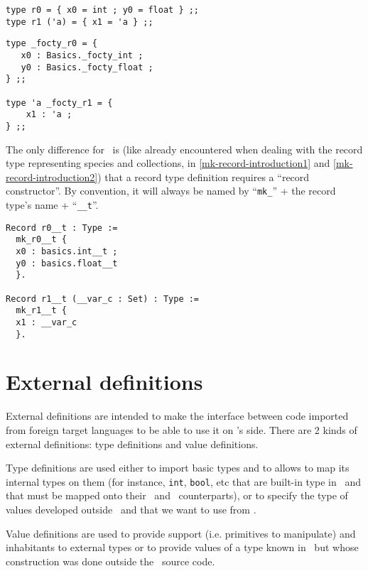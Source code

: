 {\footnotesize
\begin{lstlisting}[title=Record type definitions in \focalize]
type r0 = { x0 = int ; y0 = float } ;;
type r1 ('a) = { x1 = 'a } ;;
\end{lstlisting}}

{\footnotesize
\begin{lstlisting}[language=MyOCaml,
                   title=Generated record type definitions in \ocaml]
type _focty_r0 = { 
   x0 : Basics._focty_int ;
   y0 : Basics._focty_float ;
} ;;

type 'a _focty_r1 = { 
    x1 : 'a ;
} ;;
\end{lstlisting}}

The only difference for \coq\ is (like already encountered when
dealing with the record type representing species and collections,
in \ref{mk-record-introduction1} and \ref{mk-record-introduction2}) 
that a record type definition requires a ``record constructor''. By
convention, it will always be named by ``{\tt mk\_}'' + the record
type's name + ``{\tt \_\_t}''. 

{\footnotesize
\begin{lstlisting}[language=MyCoq,
                   title=Generated record type definitions in \coq]
Record r0__t : Type :=
  mk_r0__t {
  x0 : basics.int__t ;
  y0 : basics.float__t
  }.

Record r1__t (__var_c : Set) : Type :=
  mk_r1__t {
  x1 : __var_c
  }.
\end{lstlisting}}


\section{External definitions}
External definitions are intended to make the interface between code
imported from foreign target languages to be able to use it on
\focalize's side. There are 2 kinds of external definitions: type
definitions and value definitions.

Type definitions are used either to import basic types and to allows
\focalize to map its internal types on them (for instance, {\tt int},
{\tt bool}, etc that are built-in type in \focalize\ and that must be
mapped onto their \ocaml\ and \coq\ counterparts), or to specify the
type of values developed outside \focalize\ and that we want to use
from \focalize.

Value definitions are used to provide support (i.e. primitives to
manipulate) and inhabitants to external types or to provide values of
a type known in \focalize\ but whose construction was done outside the
\focalize\ source code.

